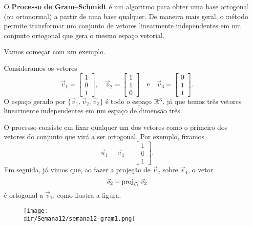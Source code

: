 \documentclass[../livro.tex]{subfiles}  %
\providecommand{\dir}{..}
\begin{document}
O \textbf{Processo de Gram--Schmidt} é um algoritmo para obter uma base ortogonal (ou ortonormal) a partir de uma base qualquer. De maneira mais geral, o método permite transformar um conjunto de vetores linearmente independentes em um conjunto ortogonal que gera o mesmo espaço vetorial. 

Vamos começar com um exemplo.

\begin{example}
Consideramos os vetores
\[
\vec{v}_1 =
\begin{bmatrix}
1 \\ 0 \\ 1
\end{bmatrix}, \quad
\vec{v}_2 =
\begin{bmatrix}
1 \\ 1 \\ 0
\end{bmatrix} \quad \text{e} \quad
\vec{v}_3 =
\begin{bmatrix}
0 \\ 1 \\ 1
\end{bmatrix}.
\] O espaço gerado por $\{\vec{v}_1, \vec{v}_2, \vec{v}_3 \}$ é todo o espaço $\mathbb{R}^3$, já que temos três vetores  linearmente independentes em um espaço de dimensão três.

O processo consiste em fixar qualquer um dos vetores como o primeiro dos vetores do conjunto que virá a ser ortogonal. Por exemplo, fixamos
\[
\vec{u}_1 = \vec{v}_1 =
\begin{bmatrix}
1 \\ 0 \\ 1
\end{bmatrix}.
\] Em seguida, já vimos que, ao fazer a projeção de $\vec{v}_2$ sobre $\vec{v}_1$, o vetor
\[
\vec{v}_2 - \operatorname{proj}_{\vec{v}_1} \vec{v}_2
\] é ortogonal a $\vec{v}_1$, como ilustra a figura.
\begin{figure}[h!]
\begin{center}
\texttt{[image: \\dir/Semana12/semana12-gram1.png]}
\end{center}
\end{figure}


\end{example}
\end{document}
